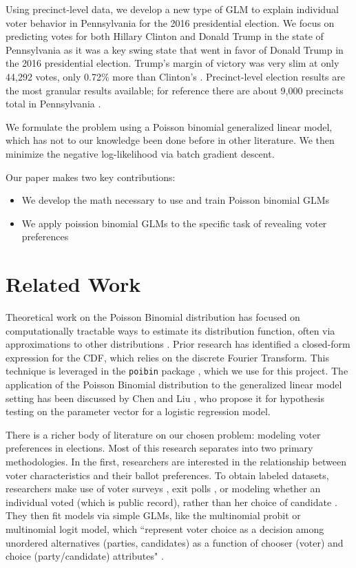 \documentclass[10pt, letterpaper]{article}
\begin{document}
Using precinct-level data, we develop a new type of GLM to explain individual voter behavior in Pennsylvania for the 2016 presidential election. We focus on predicting votes for both Hillary Clinton and Donald Trump in the state of Pennsylvania as it was a key swing state that went in favor of Donald Trump in the 2016 presidential election. Trump's margin of victory was very slim at only 44,292 votes, only 0.72\% more than Clinton's \cite{NYT}. Precinct-level election results are the most granular results available; for reference there are about 9,000 precincts total in Pennsylvania \cite{NYT}. 

We formulate the problem using a Poisson binomial generalized linear model, which has not to our knowledge been done before in other literature. We then minimize the negative log-likelihood via batch gradient descent.

Our paper makes two key contributions:
\begin{itemize}[noitemsep]
	\item We develop the math necessary to use and train Poisson binomial GLMs
	\item We apply poission binomial GLMs to the specific task of revealing voter preferences
\end{itemize}

\section{Related Work}
Theoretical work on the Poisson Binomial distribution has focused on computationally tractable ways to estimate its distribution function, often via approximations to other distributions 
\cite{EHM19917, roos1999, chen1974}. Prior research \cite{HONG201341} has identified a closed-form expression for the CDF, which relies on the discrete Fourier Transform. This technique is leveraged in the \texttt{poibin} package \cite{PoibiGithub}, which we use for this project. The application of the Poisson Binomial distribution to the generalized linear model setting has been discussed by Chen and Liu \cite{Poibi}, who propose it for hypothesis testing on the parameter vector for a logistic regression model. 

There is a richer body of literature on our chosen problem: modeling voter preferences in elections. Most of this research separates into two primary methodologies. In the first, researchers are interested in the relationship between voter characteristics and their ballot preferences. To obtain labeled datasets, researchers make use of voter surveys \cite{dubrow2007choosing}, exit polls \cite{carsey1995contextual}, or modeling whether an individual voted (which is public record), rather than her choice of candidate \cite{rusch2013influencing}. They then fit models via simple GLMs, like the multinomial probit or multinomial logit model, which ``represent voter choice as a decision among unordered alternatives (parties, candidates) as a function of chooser (voter) and choice (party/candidate) attributes" \cite{DOW2004107}. 
\end{document}
